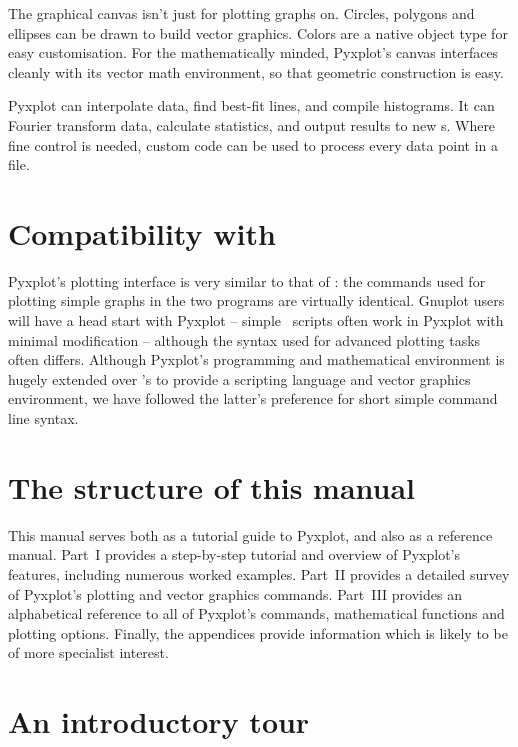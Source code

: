 
The graphical canvas isn't just for plotting graphs on. Circles, polygons and
ellipses can be drawn to build vector graphics. Colors are a native object type
for easy customisation. For the mathematically minded, Pyxplot's canvas
interfaces cleanly with its vector math environment, so that geometric
construction is easy.


Pyxplot can interpolate data, find best-fit lines, and compile histograms. It
can Fourier transform data, calculate statistics, and output results to new
\datafile s. Where fine control is needed, custom code can be used to process
every data point in a file.

\section{Compatibility with \gnuplot}

Pyxplot's plotting interface is very similar to that of \gnuplot: the commands
used for plotting simple graphs in the two programs are virtually identical.
Gnuplot users will have a head start with Pyxplot -- simple \gnuplot\ scripts
often work in Pyxplot with minimal modification -- although the syntax used
for advanced plotting tasks often differs. Although Pyxplot's programming and
mathematical environment is hugely extended over \gnuplot's to provide a
scripting language and vector graphics environment, we have followed the
latter's preference for short simple command line syntax.

\section{The structure of this manual}

This manual serves both as a tutorial guide to Pyxplot, and also as a reference
manual. Part~I provides a step-by-step tutorial and overview of Pyxplot's
features, including numerous worked examples. Part~II provides a detailed
survey of Pyxplot's plotting and vector graphics commands. Part~III provides an
alphabetical reference to all of Pyxplot's commands, mathematical functions and
plotting options.  Finally, the appendices provide information which is likely
to be of more specialist interest.

\section{An introductory tour}

